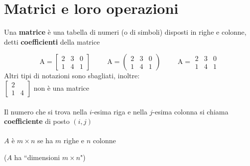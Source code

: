 \section{Matrici e loro operazioni} 
Una \textbf{matrice} è una tabella di numeri (o di simboli) disposti in righe e colonne, detti \textbf{coefficienti} della matrice

$$
\textrm{A}= 
\begin{bmatrix}
    2 & 3 & 0\\
    1 & 4 & 1 
\end{bmatrix}\hspace{1cm}
\textrm{A}= 
\begin{pmatrix}
    2 & 3 & 0\\
    1 & 4 & 1 
\end{pmatrix}\hspace{1cm}
\textrm{A}= 
\begin{matrix}
    2 & 3 & 0\\
    1 & 4 & 1 
\end{matrix}
$$
Altri tipi di notazioni sono sbagliati, inoltre:\\

$
\begin{bmatrix}
    2 & \\
    1 & 4
\end{bmatrix}
$ non è una matrice 
\\
\\
Il numero che si trova nella $i$-esima riga e nella $j$-esima colonna si chiama 
\textbf{coefficiente} di posto $(i,j)$
\\
\\
$A$ è $m\times n$ se ha $m$ righe e $n$ colonne

{\scriptsize ($A$ ha ``dimensioni $m\times n$") }

